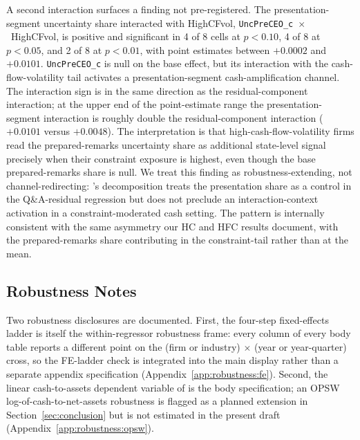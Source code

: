 A second interaction surfaces a finding not pre-registered. The presentation-segment uncertainty share interacted with HighCFvol, \texttt{UncPreCEO\_c}~$\times$~HighCFvol, is positive and significant in 4 of 8 cells at $p<0.10$, 4 of 8 at $p<0.05$, and 2 of 8 at $p<0.01$, with point estimates between $+0.0002$ and $+0.0101$. \texttt{UncPreCEO\_c} is null on the base effect, but its interaction with the cash-flow-volatility tail activates a presentation-segment cash-amplification channel. The interaction sign is in the same direction as the residual-component interaction; at the upper end of the point-estimate range the presentation-segment interaction is roughly double the residual-component interaction ($+0.0101$ versus $+0.0048$). The interpretation is that high-cash-flow-volatility firms read the prepared-remarks uncertainty share as additional state-level signal precisely when their constraint exposure is highest, even though the base prepared-remarks share is null. We treat this finding as robustness-extending, not channel-redirecting: \citeauthor{dzielinski2021}'s decomposition treats the presentation share as a control in the Q\&A-residual regression but does not preclude an interaction-context activation in a constraint-moderated cash setting. The pattern is internally consistent with the same asymmetry our HC and HFC results document, with the prepared-remarks share contributing in the constraint-tail rather than at the mean.

\subsection{Robustness Notes}
\label{sec:main:robustness}

Two robustness disclosures are documented. First, the four-step fixed-effects ladder is itself the within-regressor robustness frame: every column of every body table reports a different point on the (firm or industry) $\times$ (year or year-quarter) cross, so the FE-ladder check is integrated into the main display rather than a separate appendix specification (Appendix~\ref{app:robustness:fe}). Second, the linear cash-to-assets dependent variable of \citeauthor{bates2009} is the body specification; an OPSW log-of-cash-to-net-assets robustness is flagged as a planned extension in Section~\ref{sec:conclusion} but is not estimated in the present draft (Appendix~\ref{app:robustness:opsw}).
